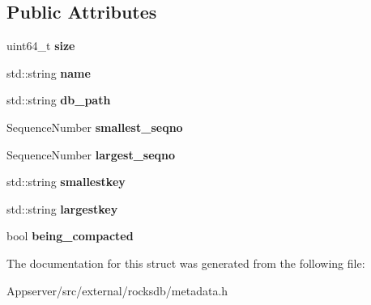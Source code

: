 \subsection*{Public Attributes}
\begin{DoxyCompactItemize}
\item 
uint64\+\_\+t {\bfseries size}\hypertarget{structrocksdb_1_1SstFileMetaData_af5b23187905a54973f04acfdaa8122de}{}\label{structrocksdb_1_1SstFileMetaData_af5b23187905a54973f04acfdaa8122de}

\item 
std\+::string {\bfseries name}\hypertarget{structrocksdb_1_1SstFileMetaData_a8fbe6325b8182c0d5c69f44878c740e0}{}\label{structrocksdb_1_1SstFileMetaData_a8fbe6325b8182c0d5c69f44878c740e0}

\item 
std\+::string {\bfseries db\+\_\+path}\hypertarget{structrocksdb_1_1SstFileMetaData_ae73dae4ea5bf17871b4a06e50a2ae827}{}\label{structrocksdb_1_1SstFileMetaData_ae73dae4ea5bf17871b4a06e50a2ae827}

\item 
Sequence\+Number {\bfseries smallest\+\_\+seqno}\hypertarget{structrocksdb_1_1SstFileMetaData_a4c76cc9d769aa88fab4c4f8a862840a9}{}\label{structrocksdb_1_1SstFileMetaData_a4c76cc9d769aa88fab4c4f8a862840a9}

\item 
Sequence\+Number {\bfseries largest\+\_\+seqno}\hypertarget{structrocksdb_1_1SstFileMetaData_aa872e1f67d24059adb8822b61e3ea042}{}\label{structrocksdb_1_1SstFileMetaData_aa872e1f67d24059adb8822b61e3ea042}

\item 
std\+::string {\bfseries smallestkey}\hypertarget{structrocksdb_1_1SstFileMetaData_ab804eabd73da19576782de20d8a66e89}{}\label{structrocksdb_1_1SstFileMetaData_ab804eabd73da19576782de20d8a66e89}

\item 
std\+::string {\bfseries largestkey}\hypertarget{structrocksdb_1_1SstFileMetaData_ac0e7cad0e9e93219d95457d2ec6f25db}{}\label{structrocksdb_1_1SstFileMetaData_ac0e7cad0e9e93219d95457d2ec6f25db}

\item 
bool {\bfseries being\+\_\+compacted}\hypertarget{structrocksdb_1_1SstFileMetaData_a7343326fd521359bc9fc6d7acf1e5be8}{}\label{structrocksdb_1_1SstFileMetaData_a7343326fd521359bc9fc6d7acf1e5be8}

\end{DoxyCompactItemize}


The documentation for this struct was generated from the following file\+:\begin{DoxyCompactItemize}
\item 
Appserver/src/external/rocksdb/metadata.\+h\end{DoxyCompactItemize}
